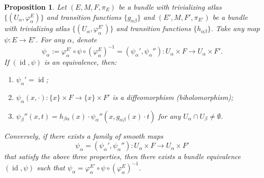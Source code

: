 \documentclass[10pt, a4paper]{article}
\newtheorem{proposition}[thm]{Proposition}
\DeclareMathOperator{\id}{id}
\begin{document}
\begin{proposition}
  Let $(E, M, F, \pi_E)$ be a bundle with trivializing atlas $\{(U_\alpha, \varphi_\alpha ^E)\}$ and transition functions $\{g_{\alpha \beta}\}$ and 
  $(E', M, F', \pi_{E'})$ be a bundle with trivializing atlas $\{(U_\alpha, \varphi_\alpha ^{E'})\}$ and transition functions $\{h_{\alpha \beta}\}$.
  Take any map $\psi: E \to E'$. For any $\alpha$, denote
  $$\psi_\alpha := \varphi_\alpha ^{E'} \circ \psi \circ (\varphi_\alpha ^E)^{-1} = (\psi_\alpha', \psi_\alpha ''): U_\alpha \times F \to U_\alpha \times F'.$$
  If $(\id, \psi)$ is an equivalence, then:
  \begin{enumerate}
    \item $\psi_\alpha' = \id$;
    \item $\psi_\alpha (x, \cdot): \{x\} \times F \to \{x\} \times F'$ is a diffeomorphism (biholomorphism);
    \item $\psi_\beta ''(x, t) = h_{\beta \alpha} (x) \cdot \psi_\alpha '' (x, g_{\alpha \beta} (x) \cdot t)$ for any $U_\alpha \cap U_\beta \neq \emptyset$.
  \end{enumerate}
  Conversely, if there exists a family of smooth maps $$\psi_\alpha = (\psi_\alpha', \psi_\alpha''): U_\alpha \times F \to U_\alpha \times F'$$
  that satisfy the above three properties, then there exists a bundle equivalence $(\id, \psi)$ such that $\psi_\alpha = \varphi_\alpha ^{E'} \circ \psi \circ (\varphi_\alpha ^E)^{-1}$.
\end{proposition}
\end{document}
